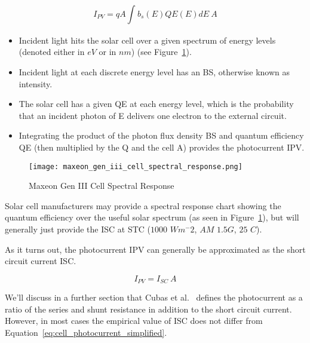 \begin{equation}
    I_{PV} = qA\int_{}{}b_s(E)QE(E)dE~A
    \label{eq:cell_photocurrent}
\end{equation}

\begin{itemize}
    \item Incident light hits the solar cell over a given spectrum of energy
    levels (denoted either in $eV$ or in $nm$) (see
    Figure~\ref{fig:maxeon_gen_iii_cell_spectral_response}).
    \item Incident light at each discrete energy level has an \ac{BS}, otherwise
    known as intensity.
    \item The solar cell has a given \ac{QE} at each energy level, which is the
    probability that an incident photon of \ac{E} delivers one electron to the
    external circuit.
    \item Integrating the product of the photon flux density \ac{BS} and quantum
    efficiency \ac{QE} (then multiplied by the \ac{Q} and the cell \ac{A})
    provides the photocurrent \ac{IPV}.
\end{itemize}

\begin{figure}[h]
    \texttt{[image: maxeon\_gen\_iii\_cell\_spectral\_response.png]}
    \caption{Maxeon Gen III Cell Spectral Response}
    \label{fig:maxeon_gen_iii_cell_spectral_response}
\end{figure}

Solar cell manufacturers may provide a spectral response chart showing the
quantum efficiency over the useful solar spectrum (as seen in
Figure~\ref{fig:maxeon_gen_iii_cell_spectral_response}), but will generally just
provide the \ac{ISC} at \ac{STC} ($1000$ $Wm^-2$, $AM$ $1.5G$, $25$ $C$).

As it turns out, the photocurrent \ac{IPV} can generally be approximated as the
short circuit current \ac{ISC}.

\begin{equation}
    I_{PV} = I_{SC}~A
    \label{eq:cell_photocurrent_simplified}
\end{equation}

We'll discuss in a further section that Cubas et al.~\cite{cubas_et_al} defines
the photocurrent as a ratio of the series and shunt resistance in addition to
the short circuit current. However, in most cases the empirical value of
\ac{ISC} does not differ from Equation~\ref{eq:cell_photocurrent_simplified}.

